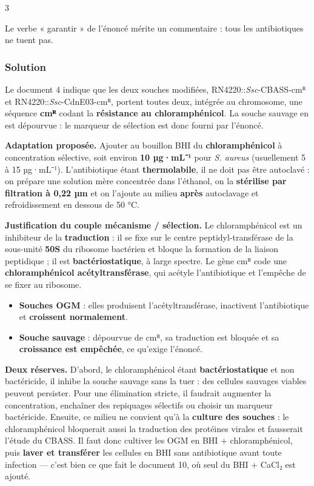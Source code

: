 \documentclass[11pt,a4paper]{article}
\providecommand{\tightlist}{\setlength{\itemsep}{0pt}\setlength{\parskip}{0pt}}
\begin{document}
\begin{indication}{3}

Le verbe « garantir » de l'énoncé mérite un commentaire : tous les antibiotiques ne tuent pas.

\end{indication}

\hypertarget{solution-8}{%
\subsubsection{Solution}\label{solution-8}}

Le document 4 indique que les deux souches modifiées, RN4220::\emph{Ssc}-CBASS-cmᴿ et RN4220::\emph{Ssc}-CdnE03-cmᴿ, portent toutes deux, intégrée au chromosome, une séquence \textbf{cmᴿ} codant la \textbf{résistance au chloramphénicol}. La souche sauvage en est dépourvue : le marqueur de sélection est donc fourni par l'énoncé.

\textbf{Adaptation proposée.} Ajouter au bouillon BHI du \textbf{chloramphénicol} à concentration sélective, soit environ \textbf{10 µg·mL⁻¹} pour \emph{S. aureus} (usuellement 5 à 15 µg·mL⁻¹). L'antibiotique étant \textbf{thermolabile}, il ne doit pas être autoclavé : on prépare une solution mère concentrée dans l'éthanol, on la \textbf{stérilise par filtration à 0,22 µm} et on l'ajoute au milieu \textbf{après} autoclavage et refroidissement en dessous de 50 °C.

\textbf{Justification du couple mécanisme / sélection.} Le chloramphénicol est un inhibiteur de la \textbf{traduction} : il se fixe sur le centre peptidyl-transférase de la sous-unité \textbf{50S} du ribosome bactérien et bloque la formation de la liaison peptidique ; il est \textbf{bactériostatique}, à large spectre. Le gène cmᴿ code une \textbf{chloramphénicol acétyltransférase}, qui acétyle l'antibiotique et l'empêche de se fixer au ribosome.

\begin{itemize}
\tightlist
\item
  \textbf{Souches OGM} : elles produisent l'acétyltransférase, inactivent l'antibiotique et \textbf{croissent normalement}.
\item
  \textbf{Souche sauvage} : dépourvue de cmᴿ, sa traduction est bloquée et sa \textbf{croissance est empêchée}, ce qu'exige l'énoncé.
\end{itemize}

\textbf{Deux réserves.} D'abord, le chloramphénicol étant \textbf{bactériostatique} et non bactéricide, il inhibe la souche sauvage sans la tuer : des cellules sauvages viables peuvent persister. Pour une élimination stricte, il faudrait augmenter la concentration, enchaîner des repiquages sélectifs ou choisir un marqueur bactéricide. Ensuite, ce milieu ne convient qu'à la \textbf{culture des souches} : le chloramphénicol bloquerait aussi la traduction des protéines virales et fausserait l'étude du CBASS. Il faut donc cultiver les OGM en BHI + chloramphénicol, puis \textbf{laver et transférer} les cellules en BHI sans antibiotique avant toute infection --- c'est bien ce que fait le document 10, où seul du BHI + CaCl₂ est ajouté.
\end{document}
